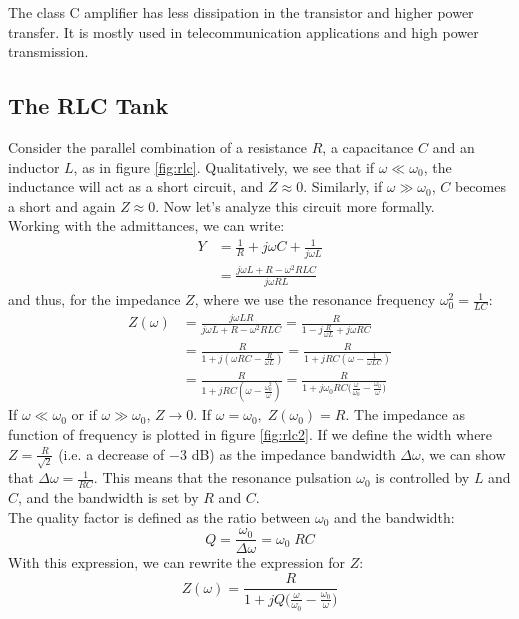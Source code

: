 The class C amplifier has less dissipation in the transistor and higher power transfer. It is mostly used in telecommunication applications and high power transmission.

\subsection{The RLC Tank}
\label{sec:rlc}
Consider the parallel combination of a resistance $R$, a capacitance $C$ and an inductor $L$, as in figure \ref{fig:rlc}. Qualitatively, we see that if $\omega \ll \omega_0$, the inductance will act as a short circuit, and $Z \approx 0$. Similarly, if $\omega \gg \omega_0$, $C$ becomes a short and again $Z \approx 0$. Now let's analyze this circuit more formally.\\
Working with the admittances, we can write:
\begin{align*}
	Y &= \frac{1}{R} + j\omega C + \frac{1}{j\omega L} \\
	  &= \frac{j \omega L + R - \omega^2 RLC}{j\omega RL}
\end{align*}
and thus, for the impedance $Z$, where we use the resonance frequency $\omega_0^2 = \frac{1}{LC}$:
\begin{align*}
	Z(\omega) &=  \frac{j\omega LR}{j \omega L + R - \omega^2 RLC} = \frac{R}{1 - j\frac{R}{\omega L} + j\omega RC} \\
	  &= \frac{R}{1 + j(\omega RC - \frac{R}{\omega L})} = \frac{R}{1 + jRC (\omega - \frac{1}{\omega LC})}  \\
	  &=  \frac{R}{1 + jRC (\omega - \frac{\omega_0^2}{\omega})} = \frac{R}{1 + j\omega_0 RC \Big(\frac{\omega}{\omega_0} - \frac{\omega_0}{\omega}\Big)}
\end{align*}
If $\omega \ll \omega_0$ or if $\omega \gg \omega_0$, $Z \rightarrow 0$. If $\omega = \omega_0, \; Z(\omega_0) = R$. The impedance as function of frequency is plotted in figure \ref{fig:rlc2}. If we define the width where $Z = \frac{R}{\sqrt{2}}$ (i.e. a decrease of $-3$ dB) as the impedance bandwidth $\Delta \omega$, we can show that $\Delta \omega = \frac{1}{RC}$. This means that the resonance pulsation $\omega_0$ is controlled by $L$ and $C$, and the bandwidth is set by $R$ and $C$.\\
The quality factor is defined as the ratio between $\omega_0$ and the bandwidth:
$$
Q = \frac{\omega_0}{\Delta \omega} = \omega_0 \; RC
$$
With this expression, we can rewrite the expression for $Z$:
\begin{equation}
	Z(\omega) = \frac{R}{1 + jQ \Big(\frac{\omega}{\omega_0} - \frac{\omega_0}{\omega}\Big)}
	\label{eq:RLC_Z}
\end{equation}

